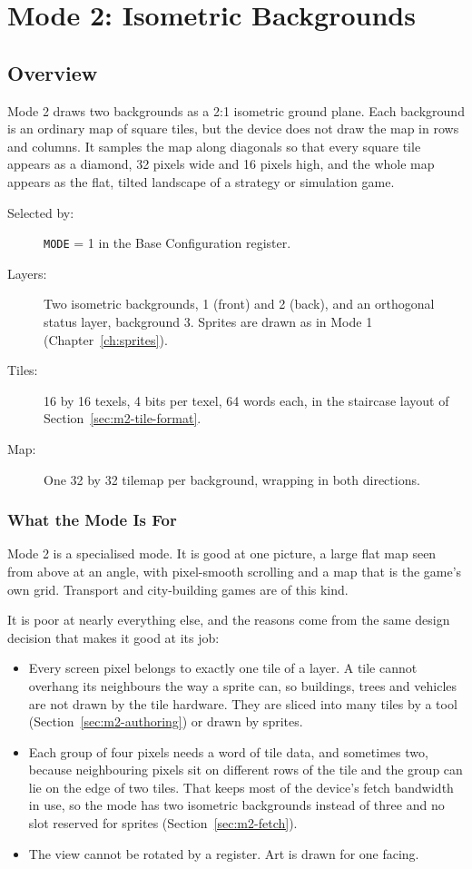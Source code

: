 \chapter{Mode 2: Isometric Backgrounds}
\label{ch:mode2}

\section{Overview}

Mode 2 draws two backgrounds as a 2:1 isometric ground plane. Each background is an ordinary map of square tiles, but
the device does not draw the map in rows and columns. It samples the map along diagonals so that every square tile
appears as a diamond, 32 pixels wide and 16 pixels high, and the whole map appears as the flat, tilted landscape of a
strategy or simulation game.

\begin{description}
	\item[Selected by:] \texttt{MODE} = 1 in the Base Configuration register.
	\item[Layers:] Two isometric backgrounds, 1 (front) and 2 (back), and an orthogonal status layer, background 3. Sprites are
	      drawn as in Mode 1 (Chapter~\ref{ch:sprites}).
	\item[Tiles:] 16 by 16 texels, 4 bits per texel, 64 words each, in the staircase layout of Section~\ref{sec:m2-tile-format}.
	\item[Map:] One 32 by 32 tilemap per background, wrapping in both directions.
\end{description}

\subsection{What the Mode Is For}

Mode 2 is a specialised mode. It is good at one picture, a large flat map seen from above at an angle, with
pixel-smooth scrolling and a map that is the game's own grid. Transport and city-building games are of this kind.

It is poor at nearly everything else, and the reasons come from the same design decision that makes it good at its job:

\begin{itemize}
	\item Every screen pixel belongs to exactly one tile of a layer. A tile cannot overhang its neighbours the way a sprite can,
	      so buildings, trees and vehicles are not drawn by the tile hardware. They are sliced into many tiles by a tool
	      (Section~\ref{sec:m2-authoring}) or drawn by sprites.
	\item Each group of four pixels needs a word of tile data, and sometimes two, because neighbouring pixels sit on different
	      rows of the tile and the group can lie on the edge of two tiles. That keeps most of the device's fetch bandwidth in
	      use, so the mode has two isometric backgrounds instead of three and no slot reserved for sprites
	      (Section~\ref{sec:m2-fetch}).
	\item The view cannot be rotated by a register. Art is drawn for one facing.
\end{itemize}

